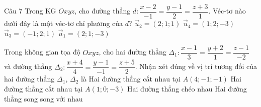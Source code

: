 \begin{ex}Câu 7%
Trong KG $Oxyz$, cho đường thẳng $d \colon \dfrac{x-2}{-1}=\dfrac{y-1}{2}=\dfrac{z+3}{1}$. Véc-tơ nào dưới đây là một véc-tơ chỉ phương của $d$?
\choice
{$\overrightarrow{u}_2=(2;1;1)$}
{$\overrightarrow{u}_4=(1;2;-3)$}
{\True $\overrightarrow{u}_3=(-1;2;1)$}
{$\overrightarrow{u}_1=(2;1;-3)$}
\end{ex}

\begin{ex}%
Trong không gian tọa độ $Oxyz$, cho hai đường thẳng $\Delta_1\colon \dfrac{x-1}{3}=\dfrac{y+2}{1}=\dfrac{z-1}{-2}$ và đường thẳng $\Delta_2\colon \dfrac{x+4}{4}=\dfrac{y-1}{-1}=\dfrac{z+5}{2}$. Nhận xét đúng về vị trí tương đối của hai đường thẳng $\Delta_1$, $\Delta_2$ là
\choice
{\True Hai đường thẳng cắt nhau tại $A(4;-1;-1)$}
{Hai đường thẳng cắt nhau tại $A(1;0;-3)$}
{Hai đường thẳng chéo nhau}
{Hai đường thẳng song song với nhau}
\end{ex}

